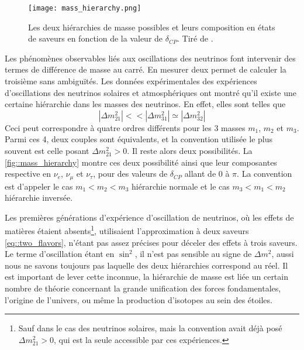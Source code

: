 		        \begin{figure}
		        	\texttt{[image: mass\_hierarchy.png]}
		        	\caption[Les deux hiérarchies de masse possibles]{\label{fig::mass_hierarchy}Les deux hiérarchies de masse possibles et leurs composition en états de saveurs en fonction de la valeur de $\delta_{CP}$. Tiré de \cite{Qian2015}.}
		        \end{figure}
	            Les phénomènes observables liés aux oscillations des neutrinos font intervenir des termes de différence de masse au carré. En mesurer deux permet de calculer la troisième sans ambiguïtés. Les données expérimentales des expériences d'oscillations des neutrinos solaires et atmosphériques ont montré qu'il existe une certaine hiérarchie dans les masses des neutrinos. En effet, elles sont telles que
	            \begin{equation}\label{eq::mass_hierarchy}
	            	|\Delta m^2_{21}| <<|\Delta m^2_{31}| \simeq |\Delta m^2_{32}| 
	            \end{equation}
	            Ceci peut correspondre à quatre ordres différents pour les 3 masses $m_1$, $m_2$ et $m_3$. Parmi ces 4, deux couples sont équivalents\cite{pdg2018}, et la convention utilisée le plus souvent est celle posant $\Delta m^2_{21} > 0$. Il reste alors deux possibilités. La \autoref{fig::mass_hierarchy} montre ces deux possibilité ainsi que leur composantes respective en $\nu_e$, $\nu_{\mu}$ et $\nu_{\tau}$, pour des valeurs de $\delta_{CP}$ allant de 0 à $\pi$\cite{Qian2015}. La convention est d'appeler le cas $m_1 < m_2 < m_3$ hiérarchie normale et le cas $m_3 < m_1 < m_2$ hiérarchie inversée.
	            
	            Les premières générations d'expérience d'oscillation de neutrinos, où les effets de matières étaient absents\footnote{Sauf dans le cas des neutrinos solaires, mais la convention avait déjà posé $\Delta m^2_{21} > 0$, qui est la seule accessible par ces expériences.}, utilisaient l'approximation à deux saveurs \eqref{eq::two_flavors}, n'étant pas assez précises pour déceler des effets à trois saveurs. Le terme d'oscillation étant en $\sin^2$, il n'est pas sensible au signe de $\Delta m^2$, aussi nous ne savons toujours pas laquelle des deux hiérarchies correspond au réel. Il est important de lever cette inconnue, la hiérarchie de masse est liée  un certain nombre de théorie concernant la grande unification des forces fondamentales, l'origine de l'univers, ou même la production d'isotopes au sein des étoiles\cite{KH-website}.
	            
